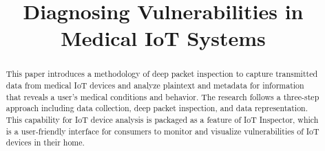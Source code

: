 \documentclass[sigconf, anonymous]{acmart}
\begin{document}
\title{Diagnosing Vulnerabilities in Medical IoT Systems} %

\begin{abstract}
This paper introduces a methodology of deep packet inspection to capture transmitted data from medical IoT devices and analyze plaintext and metadata for information that reveals a user's medical conditions and behavior. The research follows a three-step approach including data collection, deep packet inspection, and data representation. This capability for IoT device analysis is packaged as a feature of IoT Inspector, which is a user-friendly interface for consumers to monitor and visualize vulnerabilities of IoT devices in their home.
\end{abstract}




\maketitle




\end{document}
